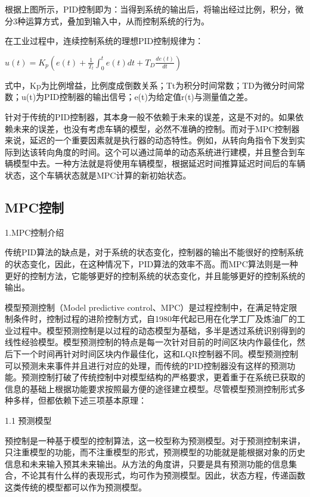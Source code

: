 根据上图所示，PID控制即为：当得到系统的输出后，将输出经过比例，积分，微分3种运算方式，叠加到输入中，从而控制系统的行为。

在工业过程中，连续控制系统的理想PID控制规律为：

$u(t)=K_{p}\left(e(t)+\frac{1}{T_{t}} \int_{0}^{t} e(t) d t+T_{D} \frac{d e(t)}{d t}\right)$

式中，Kp为比例增益，比例度成倒数关系；Tt为积分时间常数；TD为微分时间常数；u(t)为PID控制器的输出信号；e(t)为给定值r(t)与测量值之差。

针对于传统的PID控制器，其本身一般不依赖于未来的误差，这是不对的。如果依赖未来的误差，也没有考虑车辆的模型，必然不准确的控制。而对于MPC控制器来说，延迟的一个重要因素就是执行器的动态特性。例如，从转向角指令下发到实际到达该转向角度的时间。这个可以通过简单的动态系统进行建模，并且整合到车辆模型中去。一种方法就是将使用车辆模型，根据延迟时间推算延迟时间后的车辆状态，这个车辆状态就是MPC计算的新初始状态。

\subsection{MPC控制}

1.MPC控制介绍

传统PID算法的缺点是，对于系统的状态变化，控制器的输出不能很好的控制系统的状态变化，因此，在这种情况下，PID算法的效率不高。而MPC算法则是一种更好的控制方法，它能够更好的控制系统的状态变化，并且能够更好的控制系统的输出。

模型预测控制（Model predictive control、MPC）是过程控制中，在满足特定限制条件时，控制过程的进阶控制方式，自1980年代起已用在化学工厂及炼油厂的工业过程中。模型预测控制是以过程的动态模型为基础，多半是透过系统识别得到的线性经验模型。模型预测控制的特点是每一次针对目前的时间区块内作最佳化，然后下一个时间再针对时间区块内作最佳化，这和LQR控制器不同。模型预测控制可以预测未来事件并且进行对应的处理，而传统的PID控制器没有这样的预测功能。预测控制打破了传统控制中对模型结构的严格要求，更着重于在系统已获取的信息的基础上根据功能要求按照最方便的途径建立模型。尽管模型预测控制形式多种多样，但都依赖下述三项基本原理：

1.1 预测模型

预控制是一种基于模型的控制算法，这一校型称为预测模型\cite{Art3}。对于预测控制来讲，只注重模型的功能，而不注重模型的形式，预测模型的功能就是能根据对象的历史信息和未来输入预其未来输出。从方法的角度讲，只要是具有预测功能的信息集合，不论其有什么样的表现形式，均可作为预测模型。因此，状态方程，传递函数这类传统的模型都可以作为预测模型。

